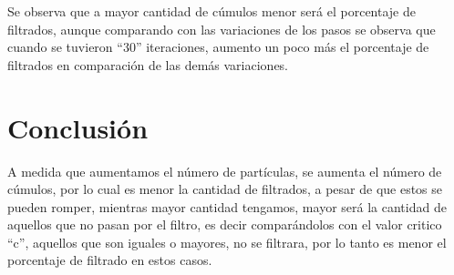 \documentclass{article}
\begin{document}
 Se observa que a mayor cantidad de c\'umulos menor ser\'a el porcentaje de filtrados, aunque comparando con las variaciones de los pasos se observa que cuando se tuvieron ``30'' iteraciones, aumento un poco m\'as el porcentaje de filtrados en comparaci\'on de las dem\'as variaciones.

\section{Conclusi\'{o}n}\label{con}

A medida que aumentamos el n\'umero de part\'iculas, se aumenta el n\'umero de c\'umulos, por lo cual es menor la cantidad de filtrados, a pesar de que estos se pueden romper, mientras mayor cantidad tengamos, mayor ser\'a la cantidad de aquellos que no pasan por el filtro, es decir compar\'andolos con el valor critico ``c'', aquellos que son iguales o mayores, no se filtrara, por lo tanto es menor el porcentaje de filtrado en estos casos.

  
  
\end{document}
